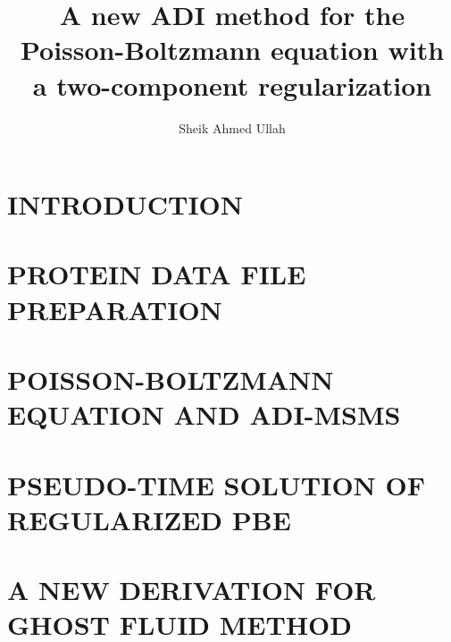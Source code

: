 \documentclass[dissertation]{uathesis}
\author{Sheik Ahmed Ullah}       %
\title{A new ADI method for the Poisson-Boltzmann equation with \protect\\ a two-component regularization}
\begin{document}
\makefrontmatter


\begin{body}

\chapter{INTRODUCTION}
\label{chap: introduction}

\chapter{PROTEIN DATA FILE PREPARATION}
\label{chap: protein_data}
 

% 
\chapter{POISSON-BOLTZMANN EQUATION AND ADI-MSMS}
\label{chap: PBE}


\chapter{PSEUDO-TIME SOLUTION OF REGULARIZED PBE}
\label{chap:opt_split}

\chapter{A NEW DERIVATION FOR GHOST FLUID METHOD}
\label{chap:new_GFM}



\end{body}
\end{document}
